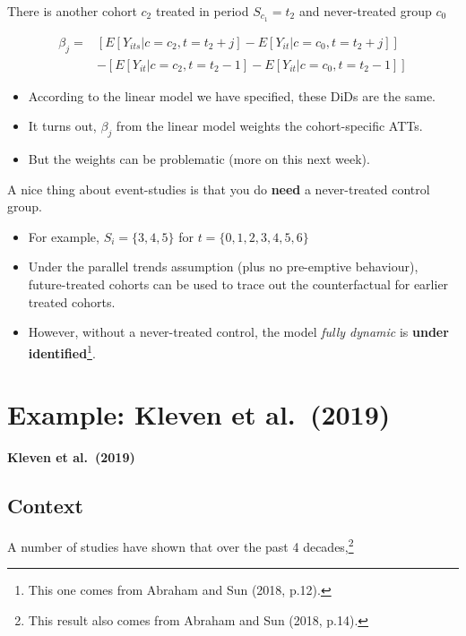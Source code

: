 \documentclass[
  letterpaper,
  DIV=11,
  numbers=noendperiod]{scrreprt}
\providecommand{\tightlist}{%
  \setlength{\itemsep}{0pt}\setlength{\parskip}{0pt}}\usepackage{longtable,booktabs,array}
\theoremstyle{definition}
\theoremstyle{remark}
\begin{document}
There is another cohort \(c_2\) treated in period \(S_{c_1} = t_2\) and
never-treated group \(c_0\)

\[
\begin{align*}
\beta_j=&\left[E[Y_{its}|c=c_2,t = t_2 + j] - E[Y_{it}|c=c_0,t = t_2+j]\right] \\
&-\left[E[Y_{it}|c=c_2,t = t_2 - 1] - E[Y_{it}|c=c_0,t = t_2 -1]\right]
\end{align*}
\]

\begin{itemize}
\tightlist
\item
  According to the linear model we have specified, these DiDs are the
  same.
\item
  It turns out, \(\beta_j\) from the linear model weights the
  cohort-specific ATTs.
\item
  But the weights can be problematic (more on this next week).
\end{itemize}

A nice thing about event-studies is that you do \textbf{need} a
never-treated control group.

\begin{itemize}
\tightlist
\item
  For example, \(S_i = \{3,4,5\}\) for \(t=\{0,1,2,3,4,5,6\}\)
\item
  Under the parallel trends assumption (plus no pre-emptive behaviour),
  future-treated cohorts can be used to trace out the counterfactual for
  earlier treated cohorts.
\item
  However, without a never-treated control, the model \emph{fully
  dynamic} is \textbf{under identified}\footnote{This one comes from
    Abraham and Sun (2018, p.12).}.
\end{itemize}

\chapter{Example: Kleven et
al.~(2019)}\label{example-kleven-et-al.-2019}

\textbf{Kleven et al.~(2019)}

\section{Context}\label{context}

A number of studies have shown that over the past 4 decades,\footnote{This
  result also comes from Abraham and Sun (2018, p.14).}
\end{document}

